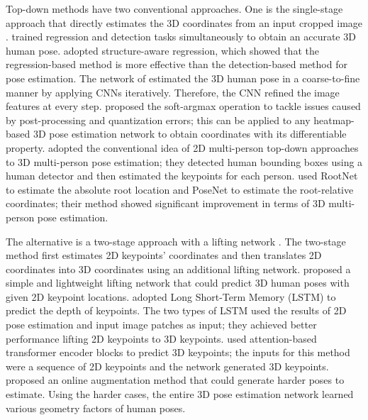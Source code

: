 \documentclass[letterpaper]{article} %
\begin{document}
Top-down methods have two conventional approaches. One is the single-stage approach that directly estimates the 3D coordinates from an input cropped image \cite{li20143d, sun2017compositional, pavlakos2017coarse, sun2018integral, moon2019camera}. \cite{li20143d} trained regression and detection tasks simultaneously to obtain an accurate 3D human pose. \cite{sun2017compositional} adopted structure-aware regression, which showed that the regression-based method is more effective than the detection-based method for pose estimation. The network of \cite{pavlakos2017coarse} estimated the 3D human pose in a coarse-to-fine manner by applying CNNs iteratively. Therefore, the CNN refined the image features at every step. \cite{sun2018integral} proposed the soft-argmax operation to tackle issues caused by post-processing and quantization errors; this can be applied to any heatmap-based 3D pose estimation network to obtain coordinates with its differentiable property. \cite{moon2019camera} adopted the conventional idea of 2D multi-person top-down approaches to 3D multi-person pose estimation; they detected human bounding boxes using a human detector and then estimated the keypoints for each person. \cite{moon2019camera} used RootNet to estimate the absolute root location and PoseNet to estimate the root-relative coordinates; their method showed significant improvement in terms of 3D multi-person pose estimation.

The alternative is a two-stage approach with a lifting network \cite{martinez2017simple, nie2017monocular, llopart2020liftformer, gong2021poseaug}. The two-stage method first estimates 2D keypoints' coordinates and then translates 2D coordinates into 3D coordinates using an additional lifting network. \cite{martinez2017simple} proposed a simple and lightweight lifting network that could predict 3D human poses with given 2D keypoint locations. \cite{nie2017monocular} adopted Long Short-Term Memory (LSTM) to predict the depth of keypoints. The two types of LSTM used the results of 2D pose estimation and input image patches as input; they achieved better performance lifting 2D keypoints to 3D keypoints. \cite{llopart2020liftformer} used attention-based transformer encoder blocks to predict 3D keypoints; the inputs for this method were a sequence of 2D keypoints and the network generated 3D keypoints. \cite{gong2021poseaug} proposed an online augmentation method that could generate harder poses to estimate. Using the harder cases, the entire 3D pose estimation network learned various geometry factors of human poses.
\end{document}
